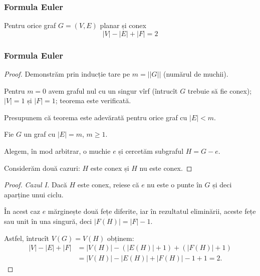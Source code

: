 \begin{frame}
  \frametitle{Formula Euler}

 \begin{theorem}
Pentru orice graf $G=(V,E)$ planar și conex
\[
  |V|-|E|+|F|=2
\]
\end{theorem}

\end{frame}



\begin{frame}
  \frametitle{Formula Euler}

 \begin{proof}
Demonstrăm prin inducție tare pe $m=||G||$ (numărul de muchii). 

Pentru $m=0$ avem graful nul cu un singur vîrf (întrucît $G$ trebuie să fie conex); $|V|=1$ și $|F|=1$; teorema este verificată.

Presupunem că teorema este adevărată pentru orice graf cu $|E|<m$. 

Fie $G$ un graf cu $|E|=m$, $m\geq 1$.

Alegem, în mod arbitrar, o muchie $e$ și cercetăm subgraful $H=G-e$. 

Considerăm două cazuri: $H$ este conex și $H$ nu este conex.

\end{proof}

\end{frame}

\begin{frame}
\begin{proof}
{\em Cazul I.} Dacă $H$ este conex, reiese că $e$ nu este o punte în $G$ și deci aparține unui ciclu.

În acest caz $e$ mărginește două fețe diferite, iar în rezultatul eliminării, aceste fețe sau unit în una singură, deci $|F(H)|=|F|-1$. 

Astfel, întrucît $V(G)=V(H)$ obținem:
\[
  \begin{array}{ll}
    |V|-|E|+|F|	&= |V(H)|-(|E(H)|+1)+(|F(H)|+1)\\
		&= |V(H)|-|E(H)|+|F(H)|-1+1 = 2.
  \end{array}
\]
 
\end{proof}

\end{frame}

